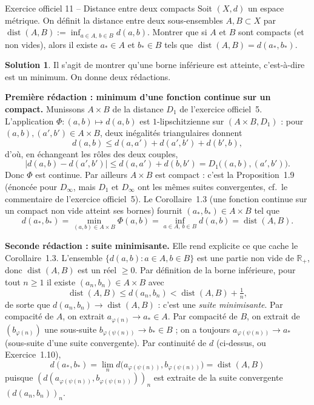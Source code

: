 \documentclass[11pt,a4paper]{article}
\newcommand{\R}{\mathbb{R}}
\newcommand{\dist}{\operatorname{dist}}
\newcommand{\abs}[1]{\left|#1\right|}
\newcommand{\ie}{c'est-à-dire}
\theoremstyle{definition}
\newtheorem*{solution}{Solution}
\begin{document}
\begin{exo}{Exercice officiel 11 -- Distance entre deux compacts}
Soit $(X,d)$ un espace métrique. On définit la distance entre deux sous-ensembles $A,B\subset X$ par $\dist(A,B):=\inf_{a\in A,\,b\in B}d(a,b)$. Montrer que si $A$ et $B$ sont compacts (et non vides), alors il existe $a_*\in A$ et $b_*\in B$ tels que $\dist(A,B)=d(a_*,b_*)$.
\end{exo}

\begin{solution}
Il s'agit de montrer qu'une borne inférieure est atteinte, \ie{} est un minimum. On donne deux rédactions.

\medskip
\noindent\textbf{Première rédaction : minimum d'une fonction continue sur un compact.} Munissons $A\times B$ de la distance $D_1$ de l'exercice officiel~5. L'application $\Phi:(a,b)\mapsto d(a,b)$ est $1$-lipschitzienne sur $(A\times B,D_1)$ : pour $(a,b),(a',b')\in A\times B$, deux inégalités triangulaires donnent
\[
d(a,b)\le d(a,a')+d(a',b')+d(b',b),
\]
d'où, en échangeant les rôles des deux couples,
\[
\abs{d(a,b)-d(a',b')}\le d(a,a')+d(b,b')=D_1\big((a,b),(a',b')\big).
\]
Donc $\Phi$ est continue. Par ailleurs $A\times B$ est compact : c'est la Proposition~1.9 (énoncée pour $D_\infty$, mais $D_1$ et $D_\infty$ ont les mêmes suites convergentes, cf.\ le commentaire de l'exercice officiel~5). Le Corollaire~1.3 (une fonction continue sur un compact non vide atteint ses bornes) fournit $(a_*,b_*)\in A\times B$ tel que
\[
d(a_*,b_*)=\min_{(a,b)\in A\times B}\Phi(a,b)=\inf_{a\in A,\,b\in B}d(a,b)=\dist(A,B).
\]

\medskip
\noindent\textbf{Seconde rédaction : suite minimisante.} Elle rend explicite ce que cache le Corollaire~1.3. L'ensemble $\{d(a,b):a\in A,b\in B\}$ est une partie non vide de $\R_+$, donc $\dist(A,B)$ est un réel $\ge0$. Par définition de la borne inférieure, pour tout $n\ge1$ il existe $(a_n,b_n)\in A\times B$ avec
\[
\dist(A,B)\le d(a_n,b_n)<\dist(A,B)+\tfrac1n ,
\]
de sorte que $d(a_n,b_n)\to\dist(A,B)$ : c'est une \emph{suite minimisante}. Par compacité de $A$, on extrait $a_{\varphi(n)}\to a_*\in A$. Par compacité de $B$, on extrait de $(b_{\varphi(n)})$ une sous-suite $b_{\varphi(\psi(n))}\to b_*\in B$ ; on a toujours $a_{\varphi(\psi(n))}\to a_*$ (sous-suite d'une suite convergente). Par continuité de $d$ (ci-dessus, ou Exercice~1.10),
\[
d(a_*,b_*)=\lim_n d\big(a_{\varphi(\psi(n))},b_{\varphi(\psi(n))}\big)=\dist(A,B)
\]
puisque $(d(a_{\varphi(\psi(n))},b_{\varphi(\psi(n))}))_n$ est extraite de la suite convergente $(d(a_n,b_n))_n$.
\end{solution}
\end{document}
